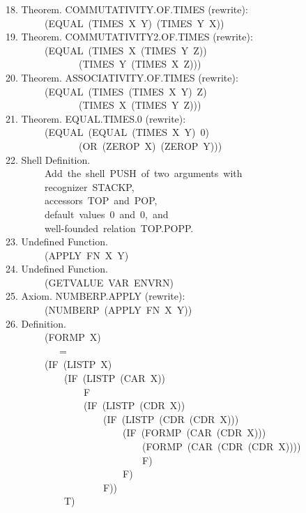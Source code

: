 \documentclass[10pt]{book}
\newenvironment{pubasis}{\begin{flushleft}}{\end{flushleft}}
\begin{document}
\begin{pubasis}
18.     Theorem.  COMMUTATIVITY.OF.TIMES (rewrite):\\
~~~~~~~~(EQUAL~(TIMES~X~Y)~(TIMES~Y~X))\\

19.     Theorem.  COMMUTATIVITY2.OF.TIMES (rewrite):\\
~~~~~~~~(EQUAL~(TIMES~X~(TIMES~Y~Z))\\
~~~~~~~~~~~~~~~(TIMES~Y~(TIMES~X~Z)))\\

20.     Theorem.  ASSOCIATIVITY.OF.TIMES (rewrite):\\
~~~~~~~~(EQUAL~(TIMES~(TIMES~X~Y)~Z)\\
~~~~~~~~~~~~~~~(TIMES~X~(TIMES~Y~Z)))\\

21.     Theorem.  EQUAL.TIMES.0 (rewrite):\\
~~~~~~~~(EQUAL~(EQUAL~(TIMES~X~Y)~0)\\
~~~~~~~~~~~~~~~(OR~(ZEROP~X)~(ZEROP~Y)))\\

22.     Shell Definition.\\
~~~~~~~~Add~the~shell~PUSH~of~two~arguments~with\\
~~~~~~~~recognizer~STACKP,\\
~~~~~~~~accessors~TOP~and~POP,\\
~~~~~~~~default~values~0~and~0,~and\\
~~~~~~~~well-founded~relation~TOP.POPP.\\

23.     Undefined Function.\\
~~~~~~~~(APPLY~FN~X~Y)\\

24.     Undefined Function.\\
~~~~~~~~(GETVALUE~VAR~ENVRN)\\

25.     Axiom.  NUMBERP.APPLY (rewrite):\\
~~~~~~~~(NUMBERP~(APPLY~FN~X~Y))\\

26.     Definition.\\
~~~~~~~~(FORMP~X)\\
~~~~~~~~~~~=\\
~~~~~~~~(IF~(LISTP~X)\\
~~~~~~~~~~~~(IF~(LISTP~(CAR~X))\\
~~~~~~~~~~~~~~~~F\\
~~~~~~~~~~~~~~~~(IF~(LISTP~(CDR~X))\\
~~~~~~~~~~~~~~~~~~~~(IF~(LISTP~(CDR~(CDR~X)))\\
~~~~~~~~~~~~~~~~~~~~~~~~(IF~(FORMP~(CAR~(CDR~X)))\\
~~~~~~~~~~~~~~~~~~~~~~~~~~~~(FORMP~(CAR~(CDR~(CDR~X))))\\
~~~~~~~~~~~~~~~~~~~~~~~~~~~~F)\\
~~~~~~~~~~~~~~~~~~~~~~~~F)\\
~~~~~~~~~~~~~~~~~~~~F))\\
~~~~~~~~~~~~T)\\


\end{pubasis}
\end{document}

